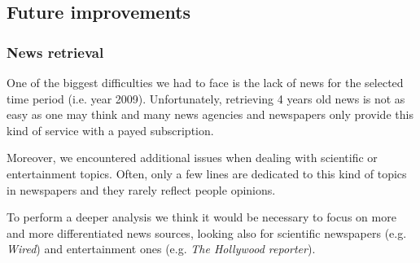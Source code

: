 \subsection*{Future improvements}
\subsubsection*{News retrieval}
One of the biggest difficulties we had to face is the lack of news for the
selected time period (i.e. year 2009). Unfortunately, retrieving 4 years old
news is not as easy as one may think and many news agencies and newspapers only
provide this kind of service with a payed subscription.

Moreover, we encountered additional issues when dealing with scientific or
entertainment topics. Often, only a few lines are dedicated to this kind of
topics in newspapers and they rarely reflect people opinions.

To perform a deeper analysis we think it would be necessary to focus on more and
more differentiated news sources, looking also for scientific newspapers (e.g.
\emph{Wired}) and entertainment ones (e.g. \emph{The Hollywood reporter}).

